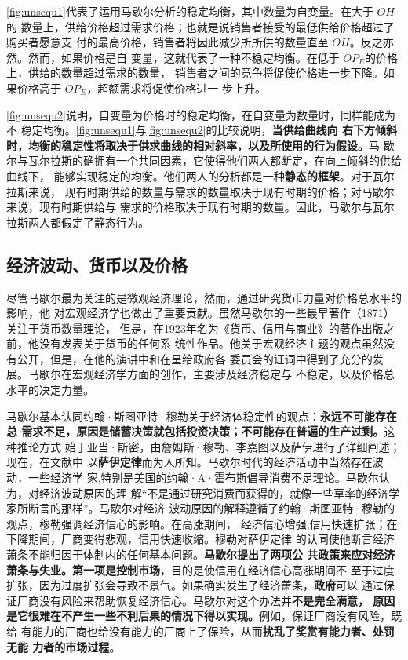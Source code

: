\cref{fig:unsequ1}代表了运用马歇尔分析的稳定均衡，其中数量为自变量。在大于 $OH$的
数量上，供给价格超过需求价格；也就是说销售者接受的最低供给价格超过了购买者愿意支
付的最高价格，销售者将因此减少所所供的数量直至 $OH$。反之亦然。然而，如果价格是自
变量，这就代表了一种不稳定均衡。在低于 $OP_E$的价格上，供给的数量超过需求的数量，
销售者之间的竞争将促使价格进一步下降。如果价格高于 $OP_E$，超额需求将促使价格进一
步上升。

\cref{fig:unsequ2}说明，自变量为价格时的稳定均衡，在自变量为数量时，同样能成为不
稳定均衡。\cref{fig:unsequ1}与\cref{fig:unsequ2}的比较说明，\textbf{当供给曲线向
  右下方倾斜时，均衡的稳定性将取决于供求曲线的相对斜率，以及所使用的行为假设。}马
歇尔与瓦尔拉斯的确拥有一个共同因素，它使得他们两人都断定，在向上倾斜的供给曲线下，
能够实现稳定的均衡。他们两人的分析都是一种\textbf{静态的框架}。对于瓦尔拉斯来说，
现有时期供给的数量与需求的数量取决于现有时期的价格；对马歇尔来说，现有时期供给与
需求的价格取决于现有时期的数量。因此，马歇尔与瓦尔拉斯两人都假定了静态行为。

\subsection{经济波动、货币以及价格}

尽管马歇尔最为关注的是微观经济理论，然而，通过研究货币力量对价格总水平的影响，他
对宏观经济学也做出了重要贡献。虽然马歇尔的一些最早著作（1871）关注于货币数量理论，
但是，在1923年名为《货币、信用与商业》的著作出版之前，他没有发表关于货币的任何系
统性作品。他关于宏观经济主题的观点虽然没有公开，但是，在他的演讲中和在呈给政府各
委员会的证词中得到了充分的发展。马歇尔在宏观经济学方面的创作，主要涉及经济稳定与
不稳定，以及价格总水平的决定力量。

马歇尔基本认同约翰·斯图亚特·穆勒关于经济体稳定性的观点：\textbf{永远不可能存在总
  需求不足，原因是储蓄决策就包括投资决策；不可能存在普遍的生产过剩。}这种推论方式
始于亚当·斯密，由詹姆斯·穆勒、李嘉图以及萨伊进行了详细阐述；现在，在文献中
以\textbf{萨伊定律}而为人所知。马歇尔时代的经济活动中当然存在波动，一些经济学
家,特别是美国的约翰·A·霍布斯倡导消费不足理论。马歇尔认为，对经济波动原因的理
解“不是通过研究消费而获得的，就像一些草率的经济学家所断言的那样”。马歇尔对经济
波动原因的解释遵循了约翰·斯图亚特·穆勒的观点，穆勒强调经济信心的影响。在高涨期间，
经济信心增强,信用快速扩张；在下降期间，厂商变得悲观，信用快速收缩。穆勒对萨伊定律
的认同使他断言经济萧条不能归因于体制内的任何基本问题。\textbf{马歇尔提出了两项公
  共政策来应对经济萧条与失业。第一项是控制市场}，目的是使信用在经济信心高涨期间不
至于过度扩张，因为过度扩张会导致不景气。如果确实发生了经济萧条，\textbf{政府}可以
通过保证厂商没有风险来帮助恢复经济信心。马歇尔对这个办法并\textbf{不是完全满意，
  原因是它很难在不产生一些不利后果的情况下得以实现。}例如，保证厂商没有风险，既给
有能力的厂商也给没有能力的厂商上了保险，从而\textbf{扰乱了奖赏有能力者、处罚无能
  力者的市场过程}。


